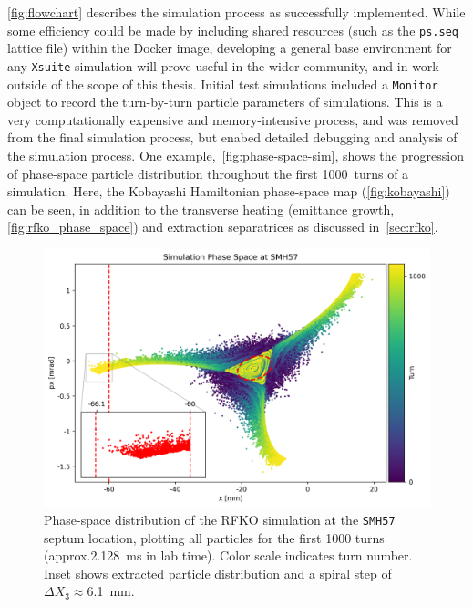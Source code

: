 \documentclass[11pt]{report}
\begin{document}
\autoref{fig:flowchart} describes the simulation process as successfully implemented. While some efficiency could be made by including shared resources (such as the \verb|ps.seq| lattice file) within the Docker image, developing a general base environment for any \verb|Xsuite| simulation will prove useful in the wider community, and in work outside of the scope of this thesis. Initial test simulations included a \verb|Monitor| object to record the turn-by-turn particle parameters of simulations. This is a very computationally expensive and memory-intensive process, and was removed from the final simulation process, but enabed detailed debugging and analysis of the simulation process. One example,~\autoref{fig:phase-space-sim}, shows the progression of phase-space particle distribution throughout the first \qty{1000}{turns} of a simulation. Here, the Kobayashi Hamiltonian phase-space map (\autoref{fig:kobayashi}) can be seen, in addition to the transverse heating (emittance growth, \autoref{fig:rfko_phase_space}) and extraction separatrices as discussed in~\autoref{sec:rfko}.

\begin{figure}[h]
  \centering
  \includegraphics[width=0.9\linewidth]{phase-space-sim.png}
  \cprotect\caption{Phase-space distribution of the RFKO simulation at the \verb|SMH57| septum location, plotting all particles for the first 1000 turns (approx.\qty{2.128}{\milli\second} in lab time). Color scale indicates turn number. Inset shows extracted particle distribution and a spiral step of $\Delta X_3\approx$\qty{6.1}{\milli\meter}.}\label{fig:phase-space-sim}
\end{figure}
\end{document}
